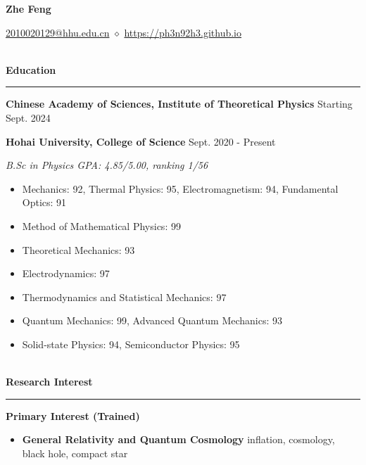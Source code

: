 \documentclass[12pt]{article}
\renewcommand*{\section}[1]{
    ~\\ \noindent \textbf{#1} \medskip \hrule \medskip
}
\begin{document}
\pagestyle{empty}


\begin{center}
    \LARGE{\textbf{Zhe Feng}}
\end{center}

\begin{center}
    \href{mailto:2010020129@hhu.edu.cn}{2010020129@hhu.edu.cn} $\diamond$ \href{https://ph3n92h3.github.io}{https://ph3n92h3.github.io}
\end{center}


\section{Education}

\textbf{Chinese Academy of Sciences, Institute of Theoretical Physics} \hfill Starting Sept. 2024

\textbf{Hohai University, College of Science} \hfill Sept. 2020 - Present

\smallskip \quad \textit{B.Sc in Physics \hfill GPA: 4.85/5.00, ranking 1/56}

\begin{itemize}[noitemsep,nolistsep]
    \item Mechanics: 92, Thermal Physics: 95, Electromagnetism: 94, Fundamental Optics: 91
    \item Method of Mathematical Physics: 99
    \item Theoretical Mechanics: 93
    \item Electrodynamics: 97
    \item Thermodynamics and Statistical Mechanics: 97
    \item Quantum Mechanics: 99, Advanced Quantum Mechanics: 93
    \item Solid-state Physics: 94, Semiconductor Physics: 95
\end{itemize}


\section{Research Interest}

\textbf{Primary Interest (Trained)}
\begin{itemize}[noitemsep,nolistsep]
    \item \textbf{General Relativity and Quantum Cosmology} inflation, cosmology, black hole, compact star
\end{itemize}
\end{document}
